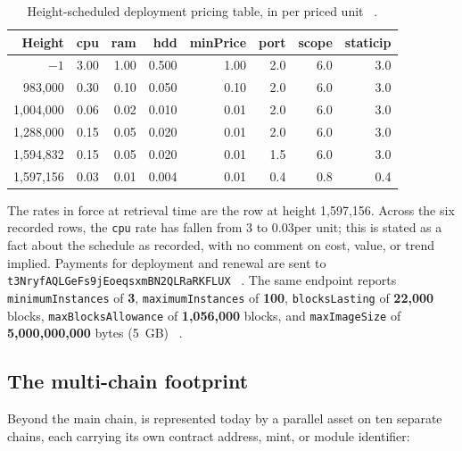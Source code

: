 \begin{table}[H]
\centering
\begin{tabular}{rrrrrrrr}
\hline
Height & cpu & ram & hdd & minPrice & port & scope & staticip \\
\hline
$-1$       & 3.00 & 1.00 & 0.500 & 1.00 & 2.0 & 6.0 & 3.0 \\
983,000    & 0.30 & 0.10 & 0.050 & 0.10 & 2.0 & 6.0 & 3.0 \\
1,004,000  & 0.06 & 0.02 & 0.010 & 0.01 & 2.0 & 6.0 & 3.0 \\
1,288,000  & 0.15 & 0.05 & 0.020 & 0.01 & 2.0 & 6.0 & 3.0 \\
1,594,832  & 0.15 & 0.05 & 0.020 & 0.01 & 1.5 & 6.0 & 3.0 \\
1,597,156  & 0.03 & 0.01 & 0.004 & 0.01 & 0.4 & 0.8 & 0.4 \\
\hline
\end{tabular}
\caption{Height-scheduled deployment pricing table, in \flux per priced unit
\shipped\ .}
\label{tab:pricing-schedule}
\end{table}

The rates in force at retrieval time are the row at height 1,597,156. Across the six recorded rows,
the \texttt{cpu} rate has fallen from 3 to 0.03\flux per unit; this is stated as a fact about the
schedule as recorded, with no comment on cost, value, or trend implied.
Payments for deployment and renewal are sent to \texttt{t3Nryf\allowbreak{}AQLGe\allowbreak{}Fs9j\allowbreak{}Eoeqsxm\allowbreak{}BN2QLRa\allowbreak{}RKFLUX}
\shipped\ . The same endpoint
reports \texttt{minimum\allowbreak{}Instances} of \textbf{3}, \texttt{maximum\allowbreak{}Instances} of \textbf{100},
\texttt{blocksLasting} of \textbf{22,000} blocks, \texttt{max\allowbreak{}Blocks\allowbreak{}Allowance} of
\textbf{1,056,000} blocks, and \texttt{maxImageSize} of \textbf{5,000,000,000} bytes (5~GB)
\shipped\ .

\subsection{The multi-chain footprint}
\label{sec:deployed-today-parallel}

Beyond the main chain, \Flux is represented today by a parallel asset on ten separate chains, each
carrying its own contract address, mint, or module identifier:

